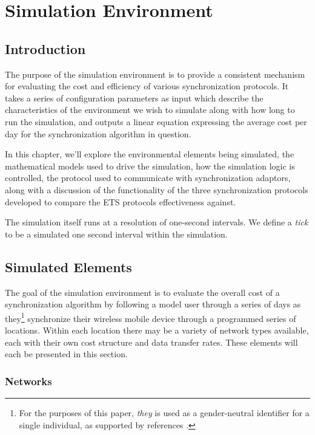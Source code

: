 \chapter{Simulation Environment}\label{simulation_chapter}

\section{Introduction}

The purpose of the simulation environment is to provide a consistent mechanism for evaluating the cost and efficiency of various synchronization protocols.  It takes a series of configuration parameters as input which describe the characteristics of the environment we wish to simulate along with how long to run the simulation, and outputs a linear equation expressing the average cost per day for the synchronization algorithm in question.

In this chapter, we'll explore the environmental elements being simulated, the mathematical models used to drive the simulation, how the simulation logic is controlled, the protocol used to communicate with synchronization adaptors, along with a discussion of the functionality of the three synchronization protocols developed to compare the ETS protocols effectiveness against.

The simulation itself runs at a resolution of one-second intervals.  We define a \emph{tick} to be a simulated one second interval within the simulation.

\section{Simulated Elements}\label{sim_elements}

The goal of the simulation environment is to evaluate the overall cost of a synchronization algorithm by following a model user through a series of days as they\footnote{For the purposes of this paper, \emph{they} is used as a gender-neutral identifier for a single individual, as supported by references \cite{theyref3, theyref2, theyref1}.} synchronize their wireless mobile device through a programmed series of locations.  Within each location there may be a variety of network types available, each with their own cost structure and data transfer rates.  These elements will each be presented in this section.

\subsection{Networks}\label{networks}

